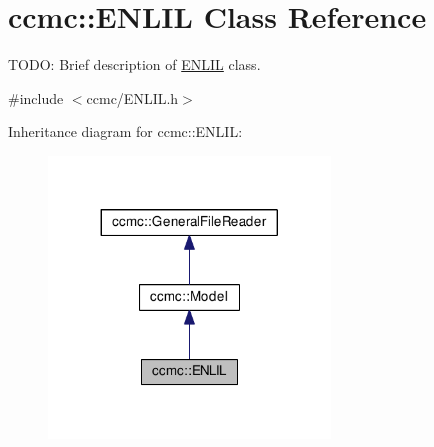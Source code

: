 \hypertarget{classccmc_1_1_e_n_l_i_l}{\section{ccmc\-:\-:E\-N\-L\-I\-L Class Reference}
\label{classccmc_1_1_e_n_l_i_l}
}


T\-O\-D\-O\-: Brief description of \hyperlink{classccmc_1_1_e_n_l_i_l}{E\-N\-L\-I\-L} class.  




{\ttfamily \#include $<$ccmc/\-E\-N\-L\-I\-L.\-h$>$}



Inheritance diagram for ccmc\-:\-:E\-N\-L\-I\-L\-:
\nopagebreak
\begin{figure}[H]
\begin{center}
\leavevmode
\includegraphics[width=212pt]{classccmc_1_1_e_n_l_i_l__inherit__graph}
\end{center}
\end{figure}


